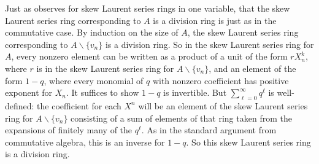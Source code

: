 \documentclass{amsart}
\theoremstyle{definition}
\theoremstyle{remark}
\numberwithin{equation}{section}
\begin{document}
Just as \cite{cohn1995skew} observes for skew Laurent series rings in one variable, that the skew Laurent series ring corresponding to $A$ is a division ring is just as in the commutative case. By induction on the size of $A$, the skew Laurent series ring corresponding to $A \backslash \{{v_{n}} \}$ is a division ring. So in the skew Laurent series ring for $A$, every nonzero element can be written as a product of a unit of the form $rX^{k}_{n}$, where $r$ is in the skew Laurent series ring for $A \backslash \{{v_{n}} \}$, and an element of the form $1 - q$, where every monomial of $q$ with nonzero coefficient has positive exponent for $X_{n}$. It suffices to show $1 - q$ is invertible. But $\sum^{\infty}_{\ell=0} q^{\ell}$ is well-defined: the coefficient for each $X^{n}$ will be an element of the skew Laurent series ring for $A \backslash \{{v_{n}} \}$ consisting of a sum of elements of that ring taken from the expansions of finitely many of the $q^{\ell}$. As in the standard argument from commutative algebra, this is an inverse for $1 - q$. So this skew Laurent series ring is a division ring.
\end{document}
